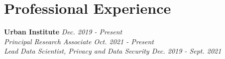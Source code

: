 \documentclass[11pt, letterpaper, roman]{moderncv} %
\begin{document}
\section{Professional Experience}
    \textbf{Urban Institute} \hfill \textit{Dec. 2019 - Present}\\
    \textit{Principal Research Associate \hfill Oct. 2021 - Present}\\
    \textit{Lead Data Scientist, Privacy and Data Security \hfill Dec. 2019 - Sept. 2021}
\end{document}
